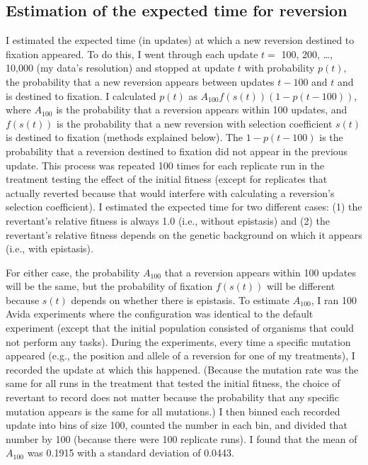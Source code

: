 \begin{doublespace}
\subsection{Estimation of the expected time for reversion}

I estimated the expected time (in updates) at which a new reversion
destined to fixation appeared.
%
To do this, I went through each update $t =$ 100, 200, \ldots, 10,000
(my data's resolution) and stopped at update $t$ with probability $p(t)$,
the probability that a new reversion appears between updates $t - 100$ and $t$
and is destined to fixation.
%
I calculated $p(t)$ as $A_{100} f(s(t))(1 - p(t - 100))$, where $A_{100}$
is the probability that a reversion appears within 100 updates,
and $f(s(t))$ is the probability that a new reversion with
selection coefficient $s(t)$ is destined to fixation (methods explained below).
%
The $1 - p(t - 100)$ is the probability that a reversion destined to fixation
did not appear in the previous update.
%
This process was repeated 100 times for each replicate run
in the treatment testing the effect of the initial fitness
(except for replicates that actually reverted because that would
interfere with calculating a reversion's selection coefficient).
%
I estimated the expected time for two different cases:
(1) the revertant's relative fitness is always 1.0 (i.e., without epistasis)
and (2) the revertant's relative fitness depends on the genetic background
on which it appears (i.e., with epistasis).



For either case, the probability $A_{100}$ that a reversion appears
within 100 updates will be the same,
but the probability of fixation $f(s(t))$ will be different because
$s(t)$ depends on whether there is epistasis.
%
To estimate $A_{100}$, I ran 100 Avida experiments where the configuration was
identical to the default experiment (except that the initial population
consisted of organisms that could not perform any tasks).
%
During the experiments, every time a specific mutation appeared
(e.g., the position and allele of a reversion for one of my treatments),
I recorded the update at which this happened.
%
(Because the mutation rate was the same for all runs in the treatment
that tested the initial fitness, the choice of revertant to record
does not matter because the probability that any specific mutation appears
is the same for all mutations.)
%
I then binned each recorded update into bins of size 100,
counted the number in each bin, and divided that number by 100
(because there were 100 replicate runs).
%
I found that the mean of $A_{100}$ was 0.1915
with a standard deviation of 0.0443.




\end{doublespace}
